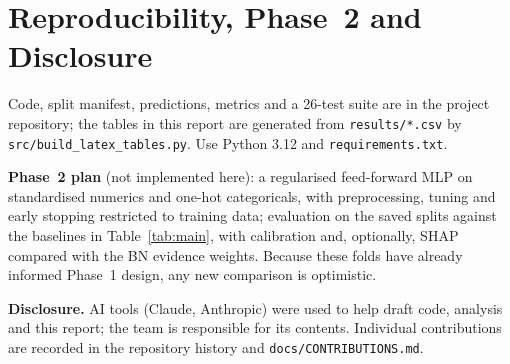 \documentclass[conference]{IEEEtran}
\begin{document}
\section{Reproducibility, Phase~2 and Disclosure}
Code, split manifest, predictions, metrics and a 26-test suite are in the project repository; the tables in this report are generated from \texttt{results/*.csv} by \texttt{src/build\_latex\_tables.py}. Use Python 3.12 and \texttt{requirements.txt}.

\textbf{Phase~2 plan} (not implemented here): a regularised feed-forward MLP on standardised numerics and one-hot categoricals, with preprocessing, tuning and early stopping restricted to training data; evaluation on the saved splits against the baselines in Table~\ref{tab:main}, with calibration and, optionally, SHAP \cite{lundberg2017} compared with the BN evidence weights. Because these folds have already informed Phase~1 design, any new comparison is optimistic.

\textbf{Disclosure.} AI tools (Claude, Anthropic) were used to help draft code, analysis and this report; the team is responsible for its contents. Individual contributions are recorded in the repository history and \texttt{docs/CONTRIBUTIONS.md}.



\end{document}
